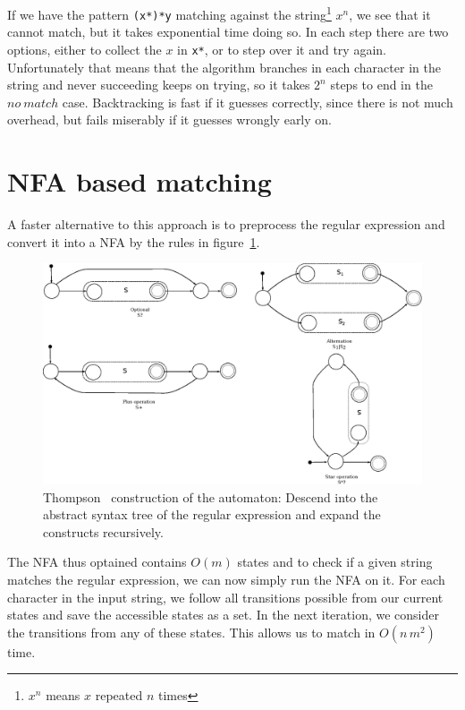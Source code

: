 \documentclass[11pt]{Thesis}
\theoremstyle{definition}
\newcommand{\Figref}[1]{figure~\ref{fig:#1}}
\begin{document}
If we have the pattern \texttt{(x*)*y} matching against the
string\footnote{$x^n$ means $x$ repeated $n$ times} $x^n$, we see that it
cannot match, but it takes exponential time doing so. In each step there
are two options, either to collect the $x$ in \texttt{x*}, or to step over it
and try again. Unfortunately that means that the algorithm branches in each
character in the string and never succeeding keeps on trying, so it takes $2^n$
steps to end in the $no\ match$ case.  Backtracking is fast if it guesses
correctly, since there is not much overhead, but fails miserably if it guesses
wrongly early on.

\section{NFA based matching}\label{sec:nfa-match}
A faster alternative to this approach is to preprocess the regular expression 
and convert it into a NFA by the rules in \Figref{thompson-construction-simple}.

\begin{figure}[htb] \includegraphics[width=\linewidth]{graphs/thompson-simple}
  \caption[Thompson construction]{Thompson~\cite{Thom68a} construction of the
automaton: Descend into the abstract syntax tree of the regular
expression and expand the constructs recursively.}
\label{fig:thompson-construction-simple} 
\end{figure}

The NFA thus optained contains $O(m)$ states and to check if a given string 
matches the regular expression, we can now simply run the NFA on it. For each 
character in the input string, we follow all transitions possible from our 
current states and save the accessible states as a set. In the next 
iteration, we consider the transitions from any of these states. This allows 
us to match in $O(n\, m^2)$ time.
\end{document}
